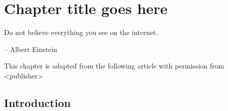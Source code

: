 \chapter{Chapter title goes here} \label{chap:chap-2}

\epigraph{Do not believe everything you see on the internet.}{-- Albert Einstein}



\begin{singlespace}         %
    This chapter is adapted from the following article with permission from <publisher>
    
\end{singlespace} 


\section{Introduction}
\Blindtext[2]
